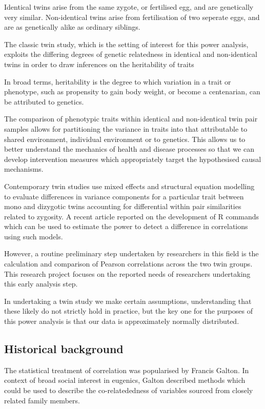 Identical twins arise from the same zygote, or fertilised egg, and are genetically very similar.  Non-identical twins arise from fertilisation of two seperate eggs, and are as genetically alike as ordinary siblings. 

The classic twin study, which is the setting of interest for this power analysis, exploits the differing degrees of genetic relatedness in identical and non-identical twins in order to draw inferences on the heritability of traits

In broad terms, heritability is the degree to which variation in a trait or phenotype, such as propensity to gain body weight, or become a centenarian, can be attributed to genetics.

The comparison of phenotypic traits within identical and non-identical twin pair samples allows for partitioning the variance in traits into that attributable to  shared environment, individual environment or to genetics.  This allows us to better understand the mechanics of health and disease processes so that we can develop intervention measures which appropriately target the hypothesised causal mechanisms.

Contemporary twin studies use mixed effects and structural equation modelling to evaluate differences in variance components for a particular trait between mono and dizygotic twins accounting for differential within pair similarities related to zygosity.  A recent article reported on the development of R commands which can be used to estimate the power to detect a difference in correlations using such models.  

However, a routine preliminary step undertaken by researchers in this field is the calculation and comparison of Pearson correlations across the two twin groups.  This research project focuses on the reported needs of researchers undertaking this early analysis step.

In undertaking a twin study we make certain assumptions, understanding that these likely do not strictly hold in practice, but the key one for the purposes of this power analysis is that our data is approximately normally distributed.

\subsection{Historical background}
The statistical treatment of correlation was popularised by Francis Galton.  In context of broad social interest in eugenics, Galton described methods which could be used to describe the co-relatededness of variables sourced from closely related family members.  

